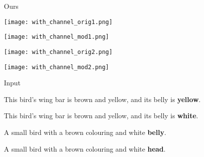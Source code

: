 \documentclass{article}
\begin{document}
\begin{figure}[t]
\begin{minipage}{0.48\textwidth}
\begin{minipage}{0.184\textwidth}
\centering
\tiny{Ours}
\end{minipage}
\begin{minipage}{0.184\textwidth}
\texttt{[image: with\_channel\_orig1.png]}
\end{minipage}
\noindent\begin{minipage}{0.184\textwidth}
\texttt{[image: with\_channel\_mod1.png]}
\end{minipage}
\noindent\begin{minipage}{0.184\textwidth}
\texttt{[image: with\_channel\_orig2.png]}
\end{minipage}
\noindent\begin{minipage}{0.184\textwidth}
\texttt{[image: with\_channel\_mod2.png]}
\end{minipage}
\end{minipage}
\begin{minipage}{0.01\textwidth}
\centering





\end{minipage}
\begin{minipage}{0.48\textwidth}
\noindent\begin{minipage}{0.184\textwidth}
\centering
\tiny{Input}
\end{minipage}
\noindent\begin{minipage}{0.184\textwidth}
\centering
\tiny{This bird's wing bar is brown and yellow, and its belly is \textbf{yellow}.}
\end{minipage}
\noindent\begin{minipage}{0.184\textwidth}
\centering
\tiny{This bird's wing bar is brown and yellow, and its belly is \textbf{white}.}
\end{minipage}
\noindent\begin{minipage}{0.184\textwidth}
\centering
\tiny{A small bird with a brown colouring and white \textbf{belly}.}
\end{minipage}
\noindent\begin{minipage}{0.184\textwidth}
\centering
\tiny{A small bird with a brown colouring and white \textbf{head}.}
\end{minipage}
\smallskip


\end{minipage}
\end{figure}
\end{document}

